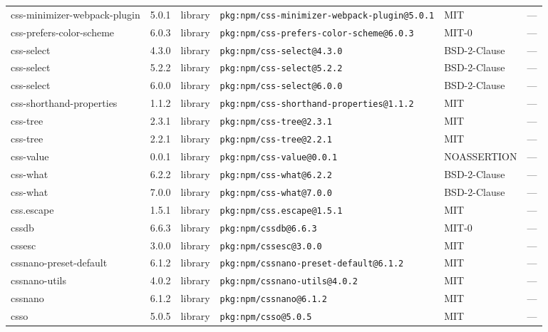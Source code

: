 \documentclass[11pt,a4paper]{article}
\begin{document}
\begin{longtable}{|p{4cm}|p{2cm}|p{1.6cm}|p{5cm}|p{1.5cm}|p{3.5cm}|}
\raggedright css-minimizer-webpack-plugin & 5.0.1 & library & \small\texttt{pkg:npm/css-minimizer-webpack-plugin@5.0.1} & MIT & \small — \\
\raggedright css-prefers-color-scheme & 6.0.3 & library & \small\texttt{pkg:npm/css-prefers-color-scheme@6.0.3} & MIT-0 & \small — \\
\raggedright css-select & 4.3.0 & library & \small\texttt{pkg:npm/css-select@4.3.0} & BSD-2-Clause & \small — \\
\raggedright css-select & 5.2.2 & library & \small\texttt{pkg:npm/css-select@5.2.2} & BSD-2-Clause & \small — \\
\raggedright css-select & 6.0.0 & library & \small\texttt{pkg:npm/css-select@6.0.0} & BSD-2-Clause & \small — \\
\raggedright css-shorthand-properties & 1.1.2 & library & \small\texttt{pkg:npm/css-shorthand-properties@1.1.2} & MIT & \small — \\
\raggedright css-tree & 2.3.1 & library & \small\texttt{pkg:npm/css-tree@2.3.1} & MIT & \small — \\
\raggedright css-tree & 2.2.1 & library & \small\texttt{pkg:npm/css-tree@2.2.1} & MIT & \small — \\
\raggedright css-value & 0.0.1 & library & \small\texttt{pkg:npm/css-value@0.0.1} & NOASSERTION & \small — \\
\raggedright css-what & 6.2.2 & library & \small\texttt{pkg:npm/css-what@6.2.2} & BSD-2-Clause & \small — \\
\raggedright css-what & 7.0.0 & library & \small\texttt{pkg:npm/css-what@7.0.0} & BSD-2-Clause & \small — \\
\raggedright css.escape & 1.5.1 & library & \small\texttt{pkg:npm/css.escape@1.5.1} & MIT & \small — \\
\raggedright cssdb & 6.6.3 & library & \small\texttt{pkg:npm/cssdb@6.6.3} & MIT-0 & \small — \\
\raggedright cssesc & 3.0.0 & library & \small\texttt{pkg:npm/cssesc@3.0.0} & MIT & \small — \\
\raggedright cssnano-preset-default & 6.1.2 & library & \small\texttt{pkg:npm/cssnano-preset-default@6.1.2} & MIT & \small — \\
\raggedright cssnano-utils & 4.0.2 & library & \small\texttt{pkg:npm/cssnano-utils@4.0.2} & MIT & \small — \\
\raggedright cssnano & 6.1.2 & library & \small\texttt{pkg:npm/cssnano@6.1.2} & MIT & \small — \\
\raggedright csso & 5.0.5 & library & \small\texttt{pkg:npm/csso@5.0.5} & MIT & \small — \\

\end{longtable}
\end{document}

